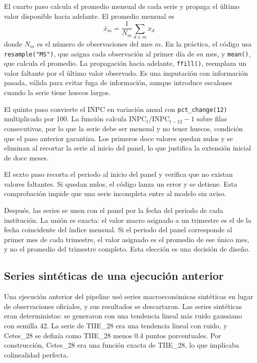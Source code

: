 El cuarto paso calcula el promedio mensual de cada serie y propaga el último valor disponible hacia adelante. El promedio mensual es
\begin{equation}
\bar{x}_m=\frac{1}{N_m}\sum_{d\in m}x_d
\label{eq:promedio_mensual}
\end{equation}
donde $N_m$ es el número de observaciones del mes $m$. En la práctica, el código usa \texttt{resample("MS")}, que asigna cada observación al primer día de su mes, y \texttt{mean()}, que calcula el promedio. La propagación hacia adelante, \texttt{ffill()}, reemplaza un valor faltante por el último valor observado. Es una imputación con información pasada, válida para evitar fuga de información, aunque introduce escalones cuando la serie tiene huecos largos.

El quinto paso convierte el INPC en variación anual con \texttt{pct\_change(12)} multiplicado por 100. La función calcula $\text{INPC}_t/\text{INPC}_{t-12}-1$ sobre filas consecutivas, por lo que la serie debe ser mensual y no tener huecos, condición que el paso anterior garantiza. Los primeros doce valores quedan nulos y se eliminan al recortar la serie al inicio del panel, lo que justifica la extensión inicial de doce meses.

El sexto paso recorta el periodo al inicio del panel y verifica que no existan valores faltantes. Si quedan nulos, el código lanza un error y se detiene. Esta comprobación impide que una serie incompleta entre al modelo sin aviso.

Después, las series se unen con el panel por la fecha del periodo de cada institución. La unión es exacta: el valor macro asignado a un trimestre es el de la fecha coincidente del índice mensual. Si el periodo del panel corresponde al primer mes de cada trimestre, el valor asignado es el promedio de ese único mes, y no el promedio del trimestre completo. Esta elección es una decisión de diseño. %

\subsection{Series sintéticas de una ejecución anterior}
Una ejecución anterior del pipeline usó series macroeconómicas sintéticas en lugar de observaciones oficiales, y sus resultados se descartaron. Las series sintéticas eran deterministas: se generaron con una tendencia lineal más ruido gaussiano con semilla 42. La serie de TIIE\_28 era una tendencia lineal con ruido, y Cetes\_28 se definía como TIIE\_28 menos 0.4 puntos porcentuales. Por construcción, Cetes\_28 era una función exacta de TIIE\_28, lo que implicaba colinealidad perfecta.

